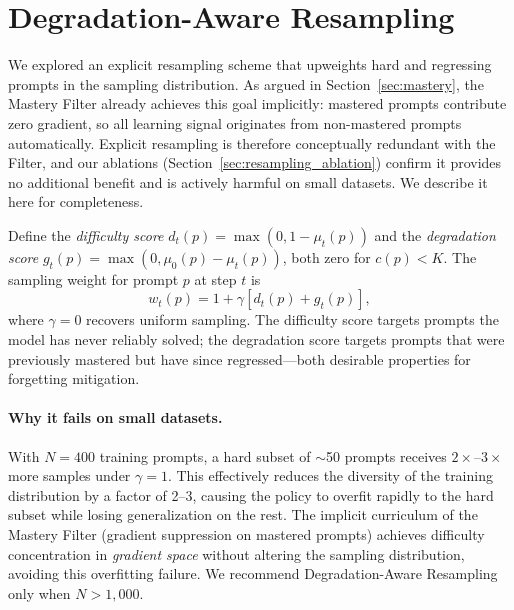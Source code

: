 \documentclass[11pt]{article}
\theoremstyle{definition}
\begin{document}
\section{Degradation-Aware Resampling}
\label{app:resampling}

We explored an explicit resampling scheme that upweights hard and regressing
prompts in the sampling distribution.
As argued in Section~\ref{sec:mastery}, the Mastery Filter already achieves
this goal implicitly: mastered prompts contribute zero gradient, so all
learning signal originates from non-mastered prompts automatically.
Explicit resampling is therefore conceptually redundant with the Filter,
and our ablations (Section~\ref{sec:resampling_ablation}) confirm it
provides no additional benefit and is actively harmful on small datasets.
We describe it here for completeness.

Define the \emph{difficulty score} $d_t(p) = \max(0, 1 - \mu_t(p))$
and the \emph{degradation score} $g_t(p) = \max(0, \mu_0(p) - \mu_t(p))$,
both zero for $c(p) < K$.
The sampling weight for prompt $p$ at step $t$ is
\begin{equation}
  w_t(p) = 1 + \gamma\!\left[d_t(p) + g_t(p)\right],
  \label{eq:weight}
\end{equation}
where $\gamma=0$ recovers uniform sampling.
The difficulty score targets prompts the model has never reliably solved;
the degradation score targets prompts that were previously mastered but
have since regressed—both desirable properties for forgetting mitigation.

\paragraph{Why it fails on small datasets.}
With $N=400$ training prompts, a hard subset of $\sim$50 prompts receives
$2\times$--$3\times$ more samples under $\gamma=1$.
This effectively reduces the diversity of the training distribution by a
factor of 2--3, causing the policy to overfit rapidly to the hard subset
while losing generalization on the rest.
The implicit curriculum of the Mastery Filter (gradient suppression on
mastered prompts) achieves difficulty concentration in \emph{gradient space}
without altering the sampling distribution, avoiding this overfitting failure.
We recommend Degradation-Aware Resampling only when $N > 1{,}000$.
\end{document}
